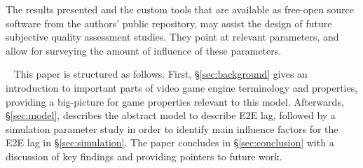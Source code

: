 The results presented and the custom tools that are available as free-open source software from the authors' public repository, may assist the design of future subjective quality assessment studies. They point at relevant parameters, and allow for surveying the amount of influence of these parameters.


~\newline
This paper is structured as follows. First, §\ref{sec:background} gives an introduction to important parts of video game engine terminology and properties, providing a big-picture for game properties relevant to this model. Afterwards, §\ref{sec:model}, describes the abstract model to describe \gls{E2E} lag, followed by a simulation parameter study in order to identify main influence factors for the \gls{E2E} lag in §\ref{sec:simulation}. The paper concludes in §\ref{sec:conclusion} with a discussion of key findings and providing pointers to future work.




